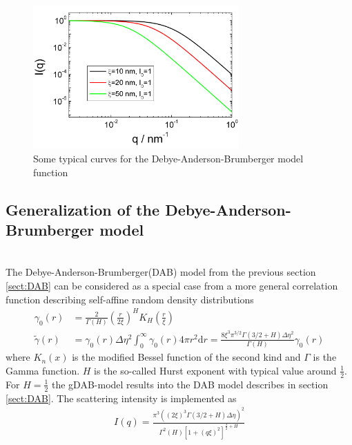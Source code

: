 \begin{figure}[htb]
\begin{center}
\includegraphics[width=0.7\textwidth]{DAB.png}
\end{center}
\caption{Some typical curves for the Debye-Anderson-Brumberger model function} \label{fig:DABIq}
\end{figure}



\clearpage
\subsection{Generalization of the Debye-Anderson-Brumberger model}
\label{sect:gDAB}~\\
The Debye-Anderson-Brumberger(DAB) model from the previous section \ref{sect:DAB} can be considered as a special case from a more general correlation function describing self-affine random density distributions \cite{Klimes2002,Hunter2006,Andersson2008}
\begin{align}
\gamma_0(r) &=
\frac{2}{\Gamma(H)}\left(\frac{r}{2\xi}\right)^H K_H\left(\frac{r}{\xi}\right) \\
\tilde{\gamma}(r) &= \gamma_0(r) \Delta\eta^2 \int_0^\infty \gamma_0(r) 4\pi r^2 \mathrm{d}r = \frac{8\xi^3\pi^{3/2}\Gamma(3/2+H)\Delta\eta^2}{\Gamma(H)}\gamma_0(r)
\end{align}
where $K_n(x)$ is the modified Bessel function of the second kind
and $\Gamma$ is the Gamma function. $H$ is the so-called Hurst
exponent with typical value around $\frac12$. For $H=\frac12$ the gDAB-model results into the DAB model describes in section \ref{sect:DAB}. The scattering intensity is implemented as
\begin{align}
I(q) =  \frac{\pi^3\left(\left(2\xi\right)^3\Gamma(3/2+H)\Delta\eta\right)^2}{\Gamma^2(H)\left[1+(q\xi)^2\right]^{\frac32+H}}
\end{align}



